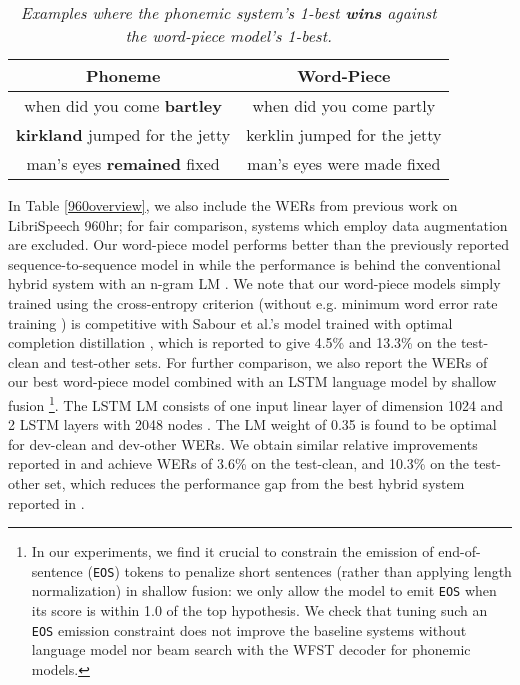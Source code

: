 \begin{table}[h]
	\centering
	\vspace{-2mm}
	\caption{\it Examples where the phonemic system's 1-best \textbf{wins} against the word-piece model's 1-best.}
	\vspace{-4mm}
	\label{plg_vs_wp}
	\begin{tabular}{ |c|c|} \hline
		Phoneme  & Word-Piece    \\ \hline
		when did you come \textbf{bartley} & when did you come partly    \\
		\textbf{kirkland} jumped for the jetty & kerklin jumped for the jetty \\ 
		man's eyes \textbf{remained} fixed & man's eyes were made fixed  \\ \hline
	\end{tabular}
		\vspace{-2mm}
\end{table}

In Table  \ref{960overview}, we also include the WERs from previous work on LibriSpeech 960hr; for fair comparison, systems which employ data augmentation \cite{park2019specaugment} are excluded.
Our word-piece model performs better than the previously reported sequence-to-sequence model
in \cite{zeyer2018:asr-attention} while the performance is behind the conventional hybrid system with
an n-gram LM \cite{han2017capio}. We note that our word-piece models simply trained using the cross-entropy criterion
(without e.g. minimum word error rate training \cite{PrabhavalkarSWN18}) is competitive with
Sabour et al.'s model trained with optimal completion distillation \cite{sabour2018optimal}, which is reported to give 4.5\% and 13.3\% on the test-clean and test-other sets.
For further comparison, we also report the WERs of our best word-piece model combined with an LSTM language model \cite{sundermeyer2012lstm} by shallow fusion \cite{ChorowskiJ17, toshniwal2018comparison}\footnote{In our experiments,
we find it crucial to constrain the emission of end-of-sentence (\texttt{EOS}) tokens \cite{ChorowskiJ17} to penalize short sentences
(rather than applying length normalization) in shallow fusion:
we only allow the model to emit \texttt{EOS} when its score is within 1.0 of the top hypothesis. We check that tuning such an \texttt{EOS} emission
constraint does not improve the baseline systems without language model
nor beam search with the WFST decoder for phonemic models.}.
The LSTM LM consists of one input linear layer of dimension 1024 and 2 LSTM layers with 2048 nodes \cite{hochreiter1997long}.
The LM weight of 0.35 is found to be optimal for dev-clean and dev-other WERs.
We obtain similar relative improvements reported in \cite{zeyer2018:asr-attention} and achieve WERs of 3.6\%
on the test-clean, and 10.3\% on the test-other set, which reduces the performance gap from the best hybrid system reported in \cite{han2017capio}.
